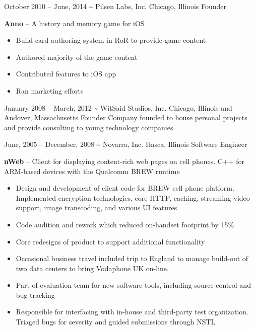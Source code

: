 \documentclass[]{friggeri-cv}
\begin{document}
\begin{entrylist}
    \entryalt
    {October 2010 -- June, 2014}
    {\textbf{\textasciitilde} Pilsen Labs, Inc.}
    {Chicago, Illinois}
    {Founder}
    {\textbf{Anno} -- A history and memory game for iOS
    \begin{itemize}
      \item Build card authoring system in RoR to provide game content
      \item Authored majority of the game content
      \item Contributed features to iOS app
      \item Ran marketing efforts
    \end{itemize}}

    \entryalt
    {January 2008 -- March, 2012}
    {\textbf{\textasciitilde} WitSaid Studios, Inc.}
    {Chicago, Illinois and Andover, Massachusetts}
    {Founder}
    {Company founded to house personal projects and provide consulting to young technology companies}

    \entryalt
    {June, 2005 -- December, 2008}
    {\textbf{\textasciitilde} Novarra, Inc.}
    {Itasca, Illinois}
    {Software Engineer}
    {\textbf{nWeb} -- Client for displaying content-rich web pages on cell phones. C++ for ARM-based devices with the Qualcomm BREW runtime
    \begin{itemize}
      \item Design and development of client code for BREW cell phone platform. Implemented encryption technologies, core HTTP, caching, streaming video support, image transcoding, and various UI features
      \item Code audition and rework which reduced on-handset footprint by 15\%
      \item Core redesigns of product to support additional functionality
      \item Occasional business travel included trip to England to manage build-out of two data centers to bring Vodaphone UK on-line.
      \item Part of evaluation team for new software tools, including source control and bug tracking
      \item Responsible for interfacing with in-house and third-party test organization. Triaged bugs for severity and guided submissions through NSTL
     \end{itemize}}
     

\end{entrylist}
\end{document}
